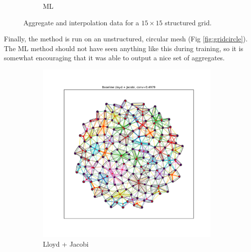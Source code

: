\documentclass{article}
\begin{document}
\begin{figure}[h]
\begin{subfigure}[t]{0.49\textwidth}
    \caption{ML}
  \end{subfigure}
  \caption{Aggregate and interpolation data for a $15 \times 15$ structured grid.}
  \label{fig:grid15}
\end{figure}

Finally, the method is run on an unstructured, circular mesh (Fig \ref{fig:gridcircle}).  The ML method should not have seen anything like this during training, so it is somewhat encouraging that it was able to output a nice set of aggregates.
\begin{figure}[h]
  \centering
  \begin{subfigure}[t]{0.49\textwidth}
    \centering
    \includegraphics[width=\textwidth]{grid_circle_lloyd.pdf}
    \caption{Lloyd + Jacobi}
  \end{subfigure}
  \begin{subfigure}[t]{0.49\textwidth}
    \centering

\end{subfigure}
\end{figure}
\end{document}
